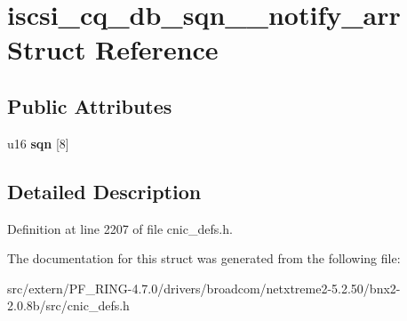 \hypertarget{structiscsi__cq__db__sqn__2__notify__arr}{
\section{iscsi\_\-cq\_\-db\_\-sqn\_\_\-notify\_\-arr Struct Reference}
\label{structiscsi__cq__db__sqn__2__notify__arr}
}
\subsection*{Public Attributes}
\begin{DoxyCompactItemize}
\item 
\hypertarget{structiscsi__cq__db__sqn__2__notify__arr_a700179e9c26e7b98b21133973055a20a}{
u16 {\bfseries sqn} \mbox{[}8\mbox{]}}
\label{structiscsi__cq__db__sqn__2__notify__arr_a700179e9c26e7b98b21133973055a20a}

\end{DoxyCompactItemize}


\subsection{Detailed Description}


Definition at line 2207 of file cnic\_\-defs.h.



The documentation for this struct was generated from the following file:\begin{DoxyCompactItemize}
\item 
src/extern/PF\_\-RING-\/4.7.0/drivers/broadcom/netxtreme2-\/5.2.50/bnx2-\/2.0.8b/src/cnic\_\-defs.h\end{DoxyCompactItemize}
